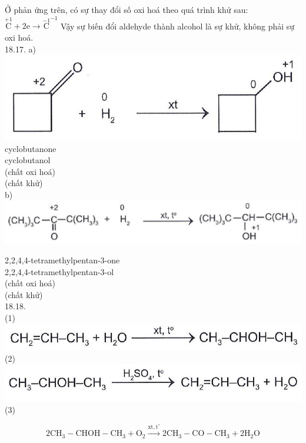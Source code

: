 \documentclass[10pt]{article}
\begin{document}
Ở phản ứng trên, có sự thay đổi số oxi hoá theo quá trình khử sau: $\stackrel{+1}{\mathrm{C}}+2 \mathrm{e} \rightarrow \stackrel{-1}{\mathrm{C}}^{-1}$ Vậy sự biến đổi aldehyde thành alcohol là sự khử, không phải sự oxi hoá.\\
18.17. a)\\
\includegraphics[max width=\textwidth, center]{2025_10_23_adad5b98d65ac6665838g-38}\\
cyclobutanone\\
cyclobutanol\\
(chất oxi hoá)\\
(chất khử)\\
b)\\
\includegraphics[max width=\textwidth, center]{2025_10_23_adad5b98d65ac6665838g-38(1)}

2,2,4,4-tetramethylpentan-3-one\\
2,2,4,4-tetramethylpentan-3-ol\\
(chất oxi hoá)\\
(chất khử)\\
18.18.\\
(1)\\
\includegraphics[max width=\textwidth, center]{2025_10_23_adad5b98d65ac6665838g-38(2)}\\
(2)\\
\includegraphics[max width=\textwidth, center]{2025_10_23_adad5b98d65ac6665838g-38(3)}\\
(3)

$$
2 \mathrm{CH}_{3}-\mathrm{CHOH}-\mathrm{CH}_{3}+\mathrm{O}_{2} \xrightarrow{\mathrm{xt}, \mathrm{t}^{\circ}} 2 \mathrm{CH}_{3}-\mathrm{CO}-\mathrm{CH}_{3}+2 \mathrm{H}_{2} \mathrm{O}
$$
\end{document}
